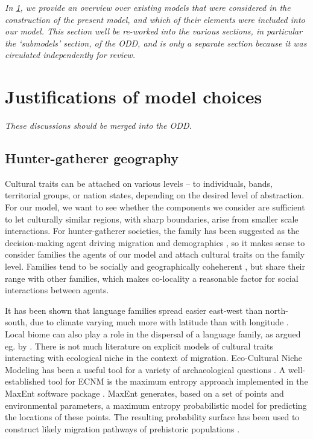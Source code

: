 \documentclass[a4paper,12pt]{scrartcl}
\begin{document}
\emph{In \cref{s:earlier}, we provide an overview over existing models that were
  considered in the construction of the present model, and which of their
  elements were included into our model. This section well be re-worked into the
  various sections, in particular the ‘submodels’ section, of the ODD, and is
  only a separate section because it was circulated independently for review.}


\section{Justifications of model choices}
\label{s:earlier}

\emph{These discussions should be merged into the ODD.}
\subsection{Hunter-gatherer geography}
\label{s:geography}
Cultural traits can be attached on various levels – to individuals, bands,
territorial groups, or nation states, depending on the desired level of
abstraction. For our model, we want to see whether the components we consider
are sufficient to let culturally similar regions, with sharp boundaries, arise
from smaller scale interactions. For hunter-gatherer societies, the family has
been suggested as the decision-making agent driving migration and demographics
\parencite{}, so it makes sense to consider families the agents of our model and
attach cultural traits on the family level. Families tend to be socially and
geographically coheherent \textcite{}, but share their range with other
families, which makes co-locality a reasonable factor for social interactions
between agents.

It has been shown that language families spread easier east-west than
north-south, due to climate varying much more with latitude than with longitude
\parencite{}. Local biome can also play a role in the dispersal of a language
family, as argued eg. by \textcite{grollemund2015bantu,ehret2015bantu}. There is
not much literature on explicit models of cultural traits interacting with
ecological niche in the context of migration. Eco-Cultural Niche Modeling
\parencite[ECNM]{banks2006ecocultural} has been a useful tool for a variety of
archaeological questions
\cite{banks2008human,banks2013ecological,dalpoimguedes2014modeling,kondo2018ecological,walker2019persistence}.
A well-established tool for ECNM is the maximum entropy approach implemented in
the MaxEnt software package
\cite{phillips2006maximum,phillips2008modeling,maxenttutorial}. MaxEnt
generates, based on a set of points and environmental parameters, a maximum
entropy probabilistic model for predicting the locations of these points. The
resulting probability surface has been used to construct likely migration
pathways of prehistoric populations \cite{kondo2018ecological}.
\end{document}
